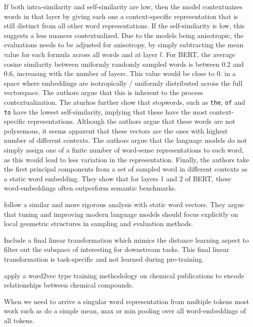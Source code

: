 \documentclass[a4paper,12pt,twoside,openright]{report}
\begin{document}
If both intra-similarity and self-similarity are low, then the model contextuaizes words in that layer by giving each one a context-specific representation that is still distinct from all other word representations.
If the self-similarity is low, this suggests a less nuances contextualized.
Due to the models being anisotropic, the evaluations needs to be adjusted for anisotropy, by simply subtracting the mean value for each formula across all words and at layer $l$. 
For BERT, the average cosine similarity between uniformly randomly sampled words is between 0.2 and 0.6, increasing with the number of layers.
This value would be close to 0. in a space where embeddings are isotropically / uniformly distributed across the full vectorspace.
The authors argue that this is inherent to the process contextualization.
The aturhos further show that stopwords, such as \texttt{the}, \texttt{of} and \texttt{to} have the lowest self-similarity, implying that these have the most context-specific representations.
Although the authors argue that these words are not polysemous, it seems apparent that these vectors are the ones with highest number of different contexts.
The authors argue that the language models do not simply assign one of a finite number of word-sense representations to each word, as this would lead to less variation in the representation.
Finally, the authors take the first principal components from a set of sampled word in different contexts as a static word embedding. 
They show that for layers 1 and 2 of BERT, these word-embeddings often outperform semantic benchmarks.

\cite{whitaker19} follow a similar and more rigorous analysis with static word vectors. 
They argue that tuning and improving modern language models should focus explicitly on local geometric structures in sampling and evaluation methods.

\cite{moradshahi19} Include a final linear transformation which mimics the distance learning aspect to filter out the subspace of interesting for downstream tasks.
This final linear transformation is task-specific and not learned during pre-training.

\cite{tshitoyan19} apply a word2vec type training methodology on chemical publications to encode relationships between chemical compounds.

When we need to arrive a singular word representation from multiple tokens most work such as \cite{bommasani19, akbik19} do a simple mean, max or min pooling over all word-embeddings of all tokens.
\end{document}
